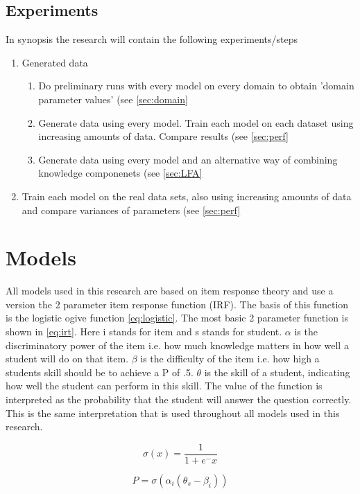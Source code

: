 \documentclass{article}
\begin{document}
\subsection{Experiments}
In synopsis the research will contain the following experiments/steps
\begin{enumerate}
\item Generated data
\begin{enumerate}
\item Do preliminary runs with every model on every domain to obtain 'domain parameter values' (see \ref{sec:domain}
\item Generate data using every model. Train each model on each dataset using increasing amounts of data. Compare results (see \ref{sec:perf}
\item Generate data using every model and an alternative way of combining knowledge componenets (see \ref{sec:LFA}
\end{enumerate}
\item Train each model on the real data sets, also using increasing amounts of data and compare variances of parameters (see \ref{sec:perf}
\end{enumerate}


\section{Models}
All models used in this research are based on item response theory and use a version the 2 parameter item response function (IRF). The basis of this function is the logistic ogive function \ref{eq:logistic}. The most basic 2 parameter function is shown in \ref{eq:irt}. Here i stands for item and s stands for student. $\alpha$ is the discriminatory power of the item i.e. how much knowledge matters in how well a student will do on that item. $\beta$ is the difficulty of the item i.e. how high a students skill should be to achieve a P of .5. $\theta$ is the skill of a student, indicating how well the student can perform in this skill. The value of the function is interpreted as the probability that the student will answer the question correctly. This is the same interpretation that is used throughout all models used in this research.

\begin{equation}
\label{eq:logistic}
\sigma(x) = \frac{1}{1+e^-x}
\end{equation}

\begin{equation}
\label{eq:irt}
P = \sigma(\alpha_{i} (\theta_{s} - \beta_{i}))
\end{equation}
\end{document}
